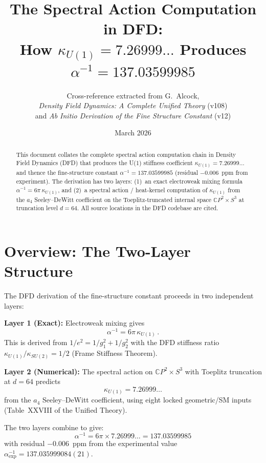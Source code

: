\documentclass[12pt,a4paper]{article}
\title{The Spectral Action Computation in DFD:\\[6pt]
\large How $\kappa_{U(1)} = 7.26999\ldots$ Produces
$\alpha^{-1} = 137.03599985$}
\author{Cross-reference extracted from G.\ Alcock,\\
\textit{Density Field Dynamics: A Complete Unified Theory} (v108)\\
and \textit{Ab Initio Derivation of the Fine Structure Constant} (v12)}
\date{March 2026}
\begin{document}
\maketitle

\begin{abstract}
This document collates the complete spectral action computation chain
in Density Field Dynamics (DFD) that produces the U(1) stiffness
coefficient $\kappa_{U(1)} = 7.26999\ldots$ and thence the fine-structure
constant $\alpha^{-1} = 137.03599985$ (residual $-0.006$~ppm from experiment).
The derivation has two layers: (1)~an exact electroweak mixing formula
$\alpha^{-1} = 6\pi\,\kappa_{U(1)}$, and (2)~a spectral action / heat-kernel
computation of $\kappa_{U(1)}$ from the $a_4$ Seeley--DeWitt coefficient on
the Toeplitz-truncated internal space $\mathbb{C}P^2 \times S^3$ at
truncation level $d = 64$.
All source locations in the DFD codebase are cited.
\end{abstract}

\tableofcontents
\newpage

\section{Overview: The Two-Layer Structure}
\label{sec:overview}

The DFD derivation of the fine-structure constant proceeds in two
independent layers:

\begin{tcolorbox}[colback=blue!5!white, colframe=blue!50!black,
  title=Two-Layer Architecture]
\textbf{Layer 1 (Exact):} Electroweak mixing gives
\[
\alpha^{-1} = 6\pi\,\kappa_{U(1)}\,.
\]
This is derived from $1/e^2 = 1/g_1^2 + 1/g_2^2$ with the DFD
stiffness ratio $\kappa_{U(1)}/\kappa_{SU(2)} = 1/2$ (Frame Stiffness
Theorem).

\medskip
\textbf{Layer 2 (Numerical):} The spectral action on
$\mathbb{C}P^2 \times S^3$ with Toeplitz truncation at $d = 64$
predicts
\[
\kappa_{U(1)} = 7.26999\ldots
\]
from the $a_4$ Seeley--DeWitt coefficient, using eight locked
geometric/SM inputs (Table~XXVIII of the Unified Theory).
\end{tcolorbox}

\noindent
The two layers combine to give:
\begin{equation}
\boxed{\alpha^{-1} = 6\pi \times 7.26999\ldots = 137.03599985}
\end{equation}
with residual $-0.006$~ppm from the experimental value
$\alpha^{-1}_{\mathrm{exp}} = 137.035999084(21)$.
\end{document}
